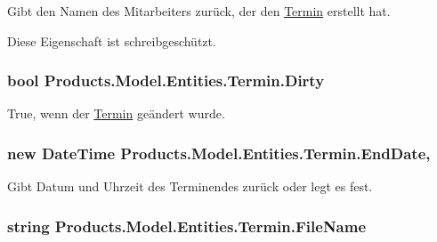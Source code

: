 Gibt den Namen des Mitarbeiters zurück, der den \hyperlink{class_products_1_1_model_1_1_entities_1_1_termin}{Termin} erstellt hat. 

Diese Eigenschaft ist schreibgeschützt.
\subsubsection[{\texorpdfstring{Dirty}{Dirty}}]{\setlength{\rightskip}{0pt plus 5cm}bool Products.\+Model.\+Entities.\+Termin.\+Dirty\hspace{0.3cm}{\ttfamily [get]}}\hypertarget{class_products_1_1_model_1_1_entities_1_1_termin_afefcb1493062b38ca52b5cde2c44b067}{}\label{class_products_1_1_model_1_1_entities_1_1_termin_afefcb1493062b38ca52b5cde2c44b067}


True, wenn der \hyperlink{class_products_1_1_model_1_1_entities_1_1_termin}{Termin} geändert wurde. 

\subsubsection[{\texorpdfstring{End\+Date}{EndDate}}]{\setlength{\rightskip}{0pt plus 5cm}new Date\+Time Products.\+Model.\+Entities.\+Termin.\+End\+Date\hspace{0.3cm}{\ttfamily [get]}, {\ttfamily [set]}}\hypertarget{class_products_1_1_model_1_1_entities_1_1_termin_acad62a89c26543e2832f36f3848ce49b}{}\label{class_products_1_1_model_1_1_entities_1_1_termin_acad62a89c26543e2832f36f3848ce49b}


Gibt Datum und Uhrzeit des Terminendes zurück oder legt es fest. 

\subsubsection[{\texorpdfstring{File\+Name}{FileName}}]{\setlength{\rightskip}{0pt plus 5cm}string Products.\+Model.\+Entities.\+Termin.\+File\+Name\hspace{0.3cm}{\ttfamily [get]}}\hypertarget{class_products_1_1_model_1_1_entities_1_1_termin_af5082db794f278084cc03c556d00c203}{}\label{class_products_1_1_model_1_1_entities_1_1_termin_af5082db794f278084cc03c556d00c203}



